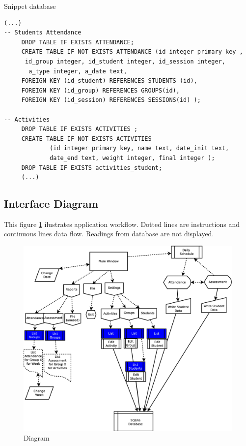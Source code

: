         
\begin{bclogo}[couleur=blue!30,arrondi=0.1,ombre=true ] 
{Snippet database}
\begin{verbatim}
(...)
-- Students Attendance
     DROP TABLE IF EXISTS ATTENDANCE;
     CREATE TABLE IF NOT EXISTS ATTENDANCE (id integer primary key ,
      id_group integer, id_student integer, id_session integer,
       a_type integer, a_date text,
     FOREIGN KEY (id_student) REFERENCES STUDENTS (id),
     FOREIGN KEY (id_group) REFERENCES GROUPS(id),
     FOREIGN KEY (id_session) REFERENCES SESSIONS(id) );

-- Activities
     DROP TABLE IF EXISTS ACTIVITIES ;
     CREATE TABLE IF NOT EXISTS ACTIVITIES
             (id integer primary key, name text, date_init text, 
             date_end text, weight integer, final integer );
     DROP TABLE IF EXISTS activities_student;
     (...)
\end{verbatim}
\end{bclogo}        

		\subsection{Interface Diagram}
		
		This figure \ref{fig:diagram} ilustrates application workflow. Dotted lines are instructions and continuous lines 
		data flow. Readings from database are not displayed. 
		
		\begin{figure}
		    \begin{center}
		        \includegraphics[scale=0.3]{eduxes_diagram.eps}
		        \caption{Diagram}
		        \label{fig:diagram}
		    \end{center}
		\end{figure}
		
